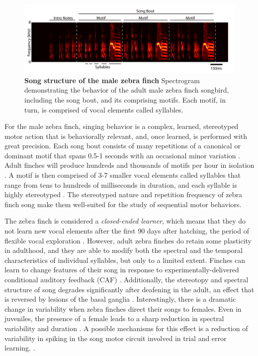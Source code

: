 \begin{figure}[!htb]
    \includegraphics[width=15cm]{figure1.png}
    \centering
\medskip
\caption[Song structure of the male zebra finch]{\footnotesize  \textbf{Song structure of the male zebra finch} Spectrogram demonstrating the behavior of the adult male zebra finch songbird, including the song bout, and its comprising motifs. Each motif, in turn, is comprised of vocal elements called syllables. }

\label{fig:Sampling}
\end{figure}

For the male zebra finch, singing behavior is a complex, learned, stereotyped motor action that is behaviorally relevant, and, once learned, is performed with great precision. Each song bout consists of many repetitions of a canonical or dominant motif that spans 0.5-1 seconds \cite{Williams2004-hn} with an occasional minor variation \cite{Sossinka1980-lf}. Adult finches will produce hundreds and thousands of motifs per hour in isolation \cite{Pytte2011-pb}. A motif is then comprised of 3-7 smaller vocal elements called syllables that range from tens to hundreds of milliseconds in duration, and each syllable is highly stereotyped \cite{Glaze2006-rl}. The stereotyped nature and repetition frequency of zebra finch song make them  well-suited for the study of sequential motor behaviors.
					
The zebra finch is considered a \emph{closed-ended learner}, which means that they do not learn new vocal elements after the first 90 days after hatching, the period of flexible vocal exploration \cite{Funabiki2009-ah}. However, adult zebra finches do retain some plasticity in adulthood, and they are able to modify both the spectral and the temporal characteristics of individual syllables, but only to a limited extent. Finches can learn to change features of their song in response to experimentally-delivered conditional auditory feedback (CAF) \cite{Ali2013-db} \cite{Andalman2009-lj}. Additionally, the stereotopy and spectral structure of song degrades significantly after deafening in the adult, an effect that is reversed by lesions of the basal ganglia \cite{Brainard2001-ep} \cite{Hamaguchi2014-sx}. Interestingly, there is a dramatic change in variability when zebra finches direct their songs to females. Even in juveniles, the presence of a female leads to a sharp reduction in spectral variability and duration \cite{Aronov2012-jj} \cite{Kojima2011-wy}. A possible mechanisms for this effect is a reduction of variability in spiking in the song motor circuit involved in trial and error learning. \cite{Hessler1999-bo}  \cite{Kao2006-gp}.

